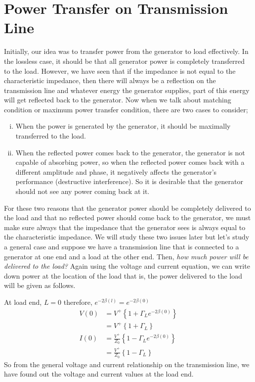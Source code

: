 \section{Power Transfer on Transmission Line}
Initially, our idea was to transfer power from the generator to load effectively. In the lossless case, it should be that all generator power is completely transferred to the load. However, we have seen that if the impedance is not equal to the characteristic impedance, then there will always be a reflection on the transmission line and whatever energy the generator supplies, part of this energy will get reflected back to the generator. Now when we talk about matching condition or maximum power transfer condition, there are two cases to consider;
\begin{enumerate}[(i)]
\item When the power is generated by the generator, it should be maximally transferred to the load.
\item When the reflected power comes back to the generator, the generator is not capable of absorbing power, so when the reflected power comes back with a different amplitude and phase, it negatively affects the generator's performance (destructive interference). So it is desirable that the generator should not see any power coming back at it.
\end{enumerate}
For these two reasons that the generator power should be completely delivered to the load and that no reflected power should come back to the generator, we must make sure always that the impedance that the generator sees is always equal to the characteristic impedance. We will study these two issues later but let's study a general case and suppose we have a transmission line that is connected to a generator at one end and a load at the other end. Then, \emph{how much power will be delivered to the load?} Again using the voltage and current equation, we can write down power at the location of the load that is, the power delivered to the load will be given as follows.

At load end, $L=0$ therefore, $e^{-2\beta (l)} = e^{-2\beta (0)}$
\begin{align*}
V(0) &= V^{+} \left\lbrace {1 + \Gamma_L e^{-2\beta(0)}}\right\rbrace\\ 
&= V^{+}\left\lbrace 1 +\Gamma_L \right\rbrace\\
I(0) &= \frac{V^{+}}{Z_0} \left\lbrace{1 - \Gamma_L e^{-2\beta(0)}}\right\rbrace\\ 
&= \frac{V^{+}}{Z_0}\left\lbrace1 -\Gamma_L \right\rbrace
\end{align*}
So from the general voltage and current relationship on the transmission line, we have found out the voltage and current values at the load end.

